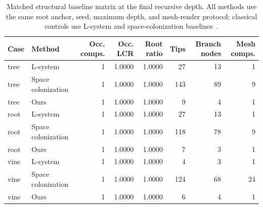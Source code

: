 \begin{table}[t]
  \centering
  \caption{Matched structural baseline matrix at the final recursive depth. All methods use the same root anchor, seed, maximum depth, and mesh-render protocol; classical controls use L-system and space-colonization baselines~\cite{lindenmayer1968lsystemsI,prusinkiewicz1990abop,runions2007spacecolonization}.}
  \label{tab:matched-structural-baseline-matrix}
  \begin{tabular}{llrrrrrr}
    \toprule
    Case & Method & Occ. comps. & Occ. LCR & Root ratio & Tips & Branch nodes & Mesh comps. \\
    \midrule
    tree & L-system & 1 & 1.0000 & 1.0000 & 27 & 13 & 1 \\
    tree & Space colonization & 1 & 1.0000 & 1.0000 & 143 & 89 & 9 \\
    tree & Ours & 1 & 1.0000 & 1.0000 & 9 & 4 & 1 \\
    root & L-system & 1 & 1.0000 & 1.0000 & 27 & 13 & 1 \\
    root & Space colonization & 1 & 1.0000 & 1.0000 & 118 & 78 & 9 \\
    root & Ours & 1 & 1.0000 & 1.0000 & 7 & 3 & 1 \\
    vine & L-system & 1 & 1.0000 & 1.0000 & 4 & 3 & 1 \\
    vine & Space colonization & 1 & 1.0000 & 1.0000 & 124 & 68 & 24 \\
    vine & Ours & 1 & 1.0000 & 1.0000 & 6 & 4 & 1 \\
    \bottomrule
  \end{tabular}
\end{table}
